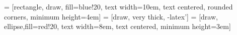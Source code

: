  = [rectangle, draw, fill=blue!20, text width=10em, text centered, rounded corners, minimum height=4em]
 = [draw, very thick, -latex']
 = [draw, ellipse,fill=red!20, text width=8em, text centered,  minimum height=3em]
